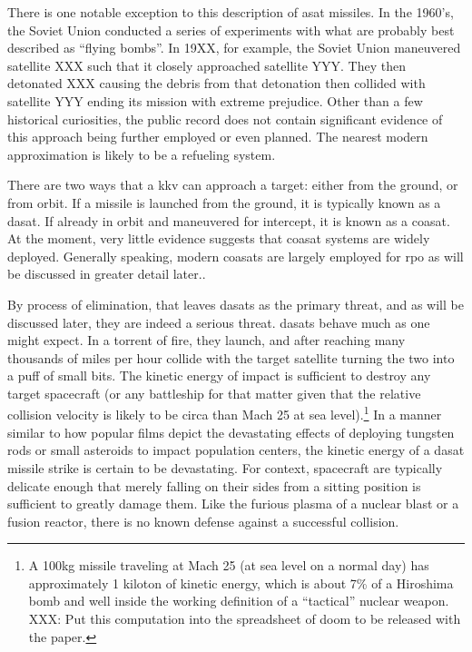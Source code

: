 There is one notable exception to this description of \ac{asat}
missiles.  In the 1960's, the Soviet Union conducted a series of
experiments with what are probably best described as ``flying
bombs''.\cite[xxx]{brian} In 19XX, for example, the Soviet Union
maneuvered satellite XXX such that it closely approached satellite
YYY.\cite[brian or grego]{xxx} They then detonated XXX causing the
debris from that detonation then collided with satellite YYY ending
its mission with extreme prejudice.\cite[xxx pick something]{xxx}
Other than a few historical curiosities, the public record does not
contain significant evidence of this approach being further employed
or even planned.  The nearest modern approximation is likely to be a
refueling system.

There are two ways that a \ac{kkv} can approach a target: either from
the ground, or from orbit.\cite[overview of asat missile paper
  needed]{xxx} If a missile is launched from the ground, it is
typically known as a \acf{dasat}.\cite[definition from brian?]{xxx} If
already in orbit and maneuvered for intercept, it is known as a
\acf{coasat}.\cite[definition from brian?]{xxx} At the moment, very
little evidence suggests that \ac{coasat} systems are widely deployed.
Generally speaking, modern \acp{coasat} are largely employed for
\ac{rpo} as will be discussed in greater detail
later.\cite[xxx]{brian}.

By process of elimination, that leaves \acp{dasat} as the primary
threat, and as will be discussed later, they are indeed a serious
threat.  \acp{dasat} behave much as one might expect.  In a torrent of
fire, they launch, and after reaching many thousands of miles per hour
collide with the target satellite turning the two into a puff of small
bits.\cite[kkv impact simulation]{xxx} The kinetic energy of impact is
sufficient to destroy any target spacecraft (or any battleship for
that matter given that the relative collision velocity is likely to be
circa than Mach 25 at sea level).\footnote{A 100kg missile traveling
at Mach 25 (at sea level on a normal day) has approximately 1 kiloton
of kinetic energy, which is about 7\% of a Hiroshima bomb and well
inside the working definition of a ``tactical'' nuclear weapon. XXX:
Put this computation into the spreadsheet of doom to be released with
the paper.} In a manner similar to how popular films depict the
devastating effects of deploying tungsten rods or small asteroids to
impact population centers, the kinetic energy of a \ac{dasat} missile
strike is certain to be devastating.  For context, spacecraft are
typically delicate enough that merely falling on their sides from a
sitting position is sufficient to greatly damage them.\cite{whoopsies}
Like the furious plasma of a nuclear blast or a fusion reactor, there
is no known defense against a successful collision.


